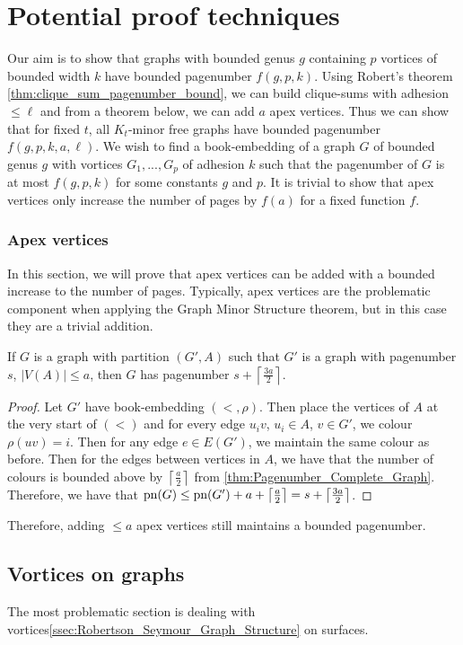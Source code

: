 
\chapter{Potential proof techniques}\label{chap:Proving_The_Theorem}
Our aim is to show that graphs with bounded genus $g$ containing $p$ vortices of bounded width $k$ have bounded pagenumber $f(g, p, k)$.
Using Robert's theorem \cref{thm:clique_sum_pagenumber_bound}, we can build clique-sums with adhesion $\leq \ell$ and from a theorem below, we can add $a$ apex vertices. 
Thus we can show that for fixed $t$, all $K_t$-minor free graphs have bounded pagenumber $f(g, p, k, a, \ell)$. 
We wish to find a book-embedding of a graph $G$ of bounded genus $g$ with vortices $G_1, ..., G_p$ of adhesion $k$ such that the pagenumber of $G$ is at most $f(g, p, k)$ for some constants $g$ and $p$. It is trivial to show that apex vertices only increase the number of pages by $f(a)$ for a fixed function $f$. 
\subsection{Apex vertices}
In this section, we will prove that apex vertices can be added with a bounded increase to the number of pages. Typically, apex vertices are the problematic component when applying the Graph Minor Structure theorem, but in this case they are a trivial addition.
\begin{theorem}
	If $G$ is a graph with partition $(G', A)$ such that $G'$ is a graph with pagenumber $s$, $|V(A)| \leq a$, then $G$ has pagenumber $s + \left\lceil \frac{3a}{2}\right\rceil$. 
\end{theorem}
\begin{proof}
	Let $G'$ have book-embedding $(<, \rho)$. Then place the vertices of $A$ at the very start of $(<)$ and for every edge $u_iv$, $u_i \in A$, $v \in G'$, we colour $\rho(uv) = i$. Then for any edge $e \in E(G')$, we maintain the same colour as before. Then for the edges between vertices in $A$, we have that the number of colours is bounded above by $\left\lceil \frac{a}{2} \right\rceil$ from \cref{thm:Pagenumber_Complete_Graph}. Therefore, we have that $\text{pn}(G) \leq \text{pn}(G') + a + \left\lceil \frac{a}{2} \right\rceil =s + \left\lceil \frac{3a}{2}\right\rceil$. 
\end{proof}

Therefore, adding $ \leq a$ apex vertices still maintains a bounded pagenumber.

\section{Vortices on graphs}
The most problematic section is dealing with vortices\cref{ssec:Robertson_Seymour_Graph_Structure} on surfaces.

